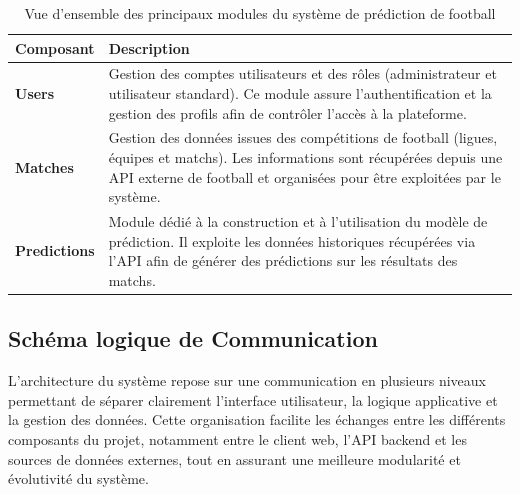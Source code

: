 \begin{table}[H]
    \centering
    \renewcommand{\arraystretch}{1.4}
    \begin{tabularx}{\textwidth}{|L|Y|}
        \hline
        \textbf{Composant} & \textbf{Description} \\
        \hline

        \textbf{Users} &
        Gestion des comptes utilisateurs et des rôles (administrateur et utilisateur standard). 
        Ce module assure l’authentification et la gestion des profils afin de contrôler l’accès à la plateforme. \\
        \hline

        \textbf{Matches} &
        Gestion des données issues des compétitions de football (ligues, équipes et matchs). 
        Les informations sont récupérées depuis une API externe de football et organisées pour être exploitées par le système. \\
        \hline

        \textbf{Predictions} &
        Module dédié à la construction et à l’utilisation du modèle de prédiction. 
        Il exploite les données historiques récupérées via l’API afin de générer des prédictions sur les résultats des matchs. \\
        \hline

    \end{tabularx}

    \caption{Vue d’ensemble des principaux modules du système de prédiction de football}
    \label{tab:architecture_systeme}
\end{table}

\subsection{Schéma logique de Communication}

L’architecture du système repose sur une communication en plusieurs niveaux permettant de séparer clairement l’interface utilisateur, la logique applicative et la gestion des données. Cette organisation facilite les échanges entre les différents composants du projet, notamment entre le client web, l’API backend et les sources de données externes, tout en assurant une meilleure modularité et évolutivité du système.

